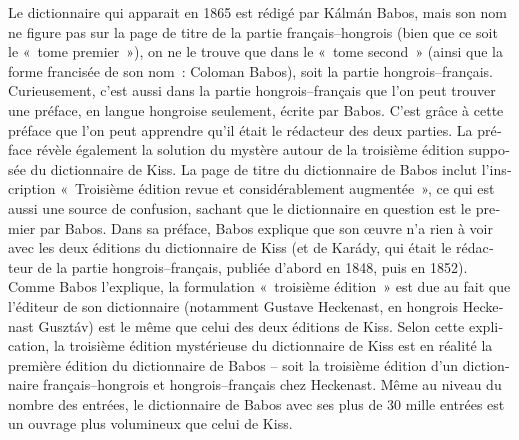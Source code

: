 \documentclass[output=paper,colorlinks,citecolor=brown,arabicfont,chinesefont,booklanguage=french]{langscibook}
\begin{document}
\begin{otherlanguage}{french}
Le dictionnaire qui apparait en 1865 est rédigé par Kálmán Babos, mais son nom ne figure pas sur la page de titre de la partie français–hongrois (bien que ce soit le «~tome premier~»), on ne le trouve que dans le «~tome second~» (ainsi que la forme francisée de son nom~: Coloman Babos), soit la partie hongrois–français. Curieusement, c’est aussi dans la partie hongrois–français que l’on peut trouver une préface, en langue hongroise seulement, écrite par Babos. C’est grâce à cette préface que l’on peut apprendre qu’il était le rédacteur des deux parties. La préface révèle également la solution du mystère autour de la troisième édition supposée du dictionnaire de Kiss. La page de titre du dictionnaire de Babos inclut l’inscription «~Troisième édition revue et considérablement augmentée~», ce qui est aussi une source de confusion, sachant que le dictionnaire en question est le premier par Babos. Dans sa préface, Babos explique que son œuvre n’a rien à voir avec les deux éditions du dictionnaire de Kiss (et de Karády, qui était le rédacteur de la partie hongrois–français, publiée d’abord en 1848, puis en 1852). Comme Babos l’explique, la formulation «~troisième édition~» est due au fait que l’éditeur de son dictionnaire (notamment Gustave Heckenast, en hongrois Heckenast Gusztáv) est le même que celui des deux éditions de Kiss. Selon cette explication, la troisième édition mystérieuse du dictionnaire de Kiss est en réalité la première édition du dictionnaire de Babos – soit la troisième édition d’un dictionnaire français–hongrois et hongrois–français chez Heckenast. Même au niveau du nombre des entrées, le dictionnaire de Babos avec ses plus de 30 mille entrées est un ouvrage plus volumineux que celui de Kiss.


\end{otherlanguage}
\end{document}
